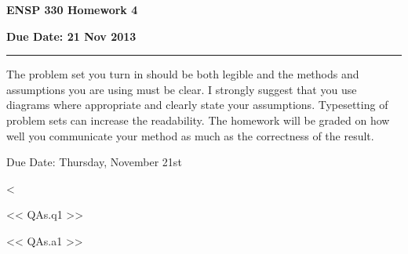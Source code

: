 \documentclass{article}
\newcommand{\chead}[1]
{\begin{center}\large\textbf{#1}\end{center}}
\newcommand{\solution}[1]
{\vspace{10pt}
{\color{answer-color} #1}
}
\begin{document}
\chead{ENSP 330 Homework 4}
\chead{Due Date: 21 Nov 2013}
\hrule
\vspace{10pt}


The problem set you turn in should be both legible and the methods and
assumptions you are using must be clear.  I strongly suggest that you
use diagrams where appropriate and clearly state your assumptions.
Typesetting of problem sets can increase the readability.  The homework
will be graded on how well you communicate your method as much as the
correctness of the result.

Due Date: Thursday, November 21st

<%

<< QAs.q1 >>

\solution{<< QAs.a1 >>}
\end{document}
